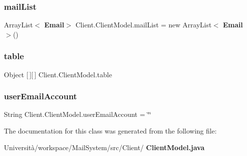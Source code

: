 \mbox{\label{class_client_1_1_client_model_aa0dc08af971a21c30440941adabfb6ce}} 
\subsubsection{mail\+List}
{\footnotesize\ttfamily Array\+List$<$\textbf{ Email}$>$ Client.\+Client\+Model.\+mail\+List = new Array\+List$<$\textbf{ Email}$>$()}

\mbox{\label{class_client_1_1_client_model_affc85e654152c659a4135a0ef4142fbe}} 
\subsubsection{table}
{\footnotesize\ttfamily Object [$\,$][$\,$] Client.\+Client\+Model.\+table\hspace{0.3cm}{\ttfamily [package]}}

\mbox{\label{class_client_1_1_client_model_abeed3ddf4450619fe80836b26e6c2f46}} 
\subsubsection{user\+Email\+Account}
{\footnotesize\ttfamily String Client.\+Client\+Model.\+user\+Email\+Account = \char`\"{}\char`\"{}}



The documentation for this class was generated from the following file\+:\begin{DoxyCompactItemize}
\item 
Università/workspace/\+Mail\+System/src/\+Client/\textbf{ Client\+Model.\+java}\end{DoxyCompactItemize}

